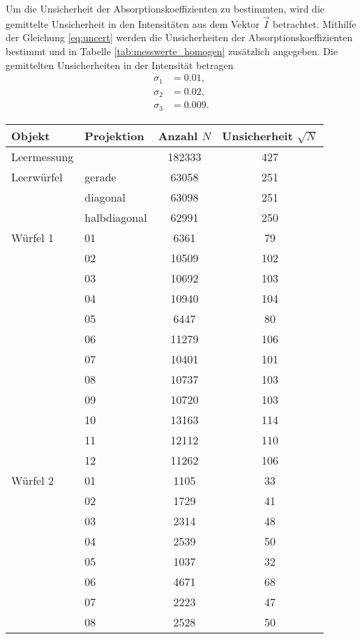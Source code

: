 Um die Unsicherheit der Absorptionskoeffizienten zu bestimmten, wird die gemittelte
Unsicherheit in den Intensitäten aus dem Vektor $\vec{I}$ betrachtet.
Mithilfe der Gleichung \eqref{eq:uncert} werden die Unsicherheiten der
Absorptionskoeffizienten bestimmt und in Tabelle \ref{tab:messwerte_homogen}
zusätzlich angegeben.
Die gemittelten Unsicherheiten in der Intensität betragen
\begin{align}
  \sigma_{1}&=0.01,\\
  \sigma_{2}&=0.02,\\
  \sigma_{3}&=0.009.
  \label{eq:uncert_log_intensity}
\end{align}

\begin{table}[p]
  \centering
  \begin{tabular}{llS[table-format=6.0]S[table-format=3.0]}
    \toprule
    {Objekt}&{Projektion}&{Anzahl $N$}&{Unsicherheit $\sqrt{N}$}\\
    \midrule
Leermessung&&            182333&   427\\
Leerwürfel &gerade&  63058&    251\\
 &diagonal&  63098&    251\\
 &halbdiagonal&  62991&    250\\
Würfel 1 & 01&  6361&     79\\
  & 02&  10509&    102\\
  & 03&  10692&    103\\
  & 04&  10940&    104\\
  & 05&  6447&     80\\
  & 06&  11279&    106\\
  & 07&  10401&    101\\
  & 08&  10737&    103\\
  & 09&  10720&    103\\
  & 10&  13163&    114\\
  & 11&  12112&    110\\
  & 12&  11262&    106\\
Würfel 2 & 01&  1105&     33\\
  & 02&  1729&     41\\
  & 03&  2314&     48\\
  & 04&  2539&     50\\
  & 05&  1037&     32\\
  & 06&  4671&     68\\
  & 07&  2223&     47\\
  & 08&  2528&     50\\

\end{tabular}
\end{table}
